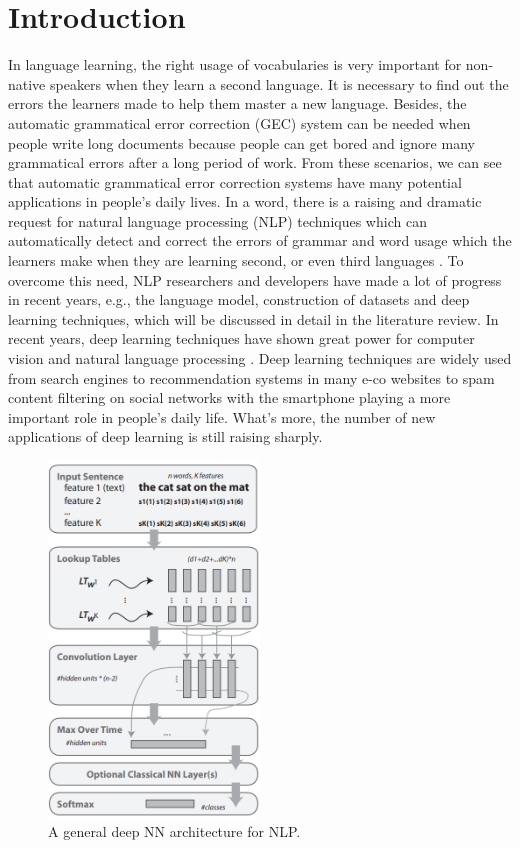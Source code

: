 \chapter{Introduction}
\label{chapter1}


In language learning, the right usage of vocabularies is very important for non-native speakers when they learn a second language. It is necessary to find out the errors the learners made to help them master a new language. Besides, the automatic grammatical error correction (GEC) system can be needed when people write long documents because people can get bored and ignore many grammatical errors after a long period of work. From these scenarios, we can see that automatic grammatical error correction systems have many potential applications in people’s daily lives. In a word, there is a raising and dramatic request for natural language processing (NLP) techniques which can automatically detect and correct the errors of grammar and word usage which the learners make when they are learning second, or even third languages \cite{leacock2010automated}. To overcome this need, NLP researchers and developers have made a lot of progress in recent years, e.g., the language model, construction of datasets and deep learning techniques, which will be discussed in detail in the literature review.
In recent years, deep learning techniques have shown great power for computer vision and natural language processing \cite{lecun2015deep}. Deep learning techniques are widely used from search engines to recommendation systems in many e-co websites to spam content filtering on social networks with the smartphone playing a more important role in people’s daily life. What’s more, the number of new applications of deep learning is still raising sharply. 

\begin{figure}[ht]
    \centering
    \includegraphics[width=0.5\textwidth]{GDNNNLP.png}
    \caption{A general deep NN architecture for NLP.}
    \label{fig:1}
\end{figure}

